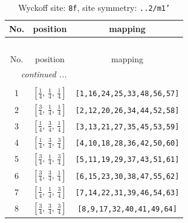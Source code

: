 \documentclass[fleqn,8pt]{jsarticle}
\begin{document}
\begin{longtable}{ccc}
\caption{Wyckoff site: {\tt 8f}, site symmetry: {\tt ..2/m1'}}
 \\
 \hline \hline
No. & position & mapping \\ \hline \endfirsthead

\multicolumn{2}{l}{\tablename\ \thetable{}} \\
 \hline \hline
No. & position & mapping \\ \hline \endhead

 \hline \hline
\multicolumn{2}{r}{\footnotesize\it continued ...} \\ \endfoot

 \hline \hline
\multicolumn{2}{r}{} \\ \endlastfoot

1 & $\left[ \frac{1}{4},\, \frac{1}{4},\, \frac{1}{4} \right]$ & {\tt [1,16,24,25,33,48,56,57]} \\ \hline
2 & $\left[ \frac{3}{4},\, \frac{1}{4},\, \frac{1}{4} \right]$ & {\tt [2,12,20,26,34,44,52,58]} \\ \hline
3 & $\left[ \frac{1}{4},\, \frac{3}{4},\, \frac{1}{4} \right]$ & {\tt [3,13,21,27,35,45,53,59]} \\ \hline
4 & $\left[ \frac{1}{4},\, \frac{3}{4},\, \frac{3}{4} \right]$ & {\tt [4,10,18,28,36,42,50,60]} \\ \hline
5 & $\left[ \frac{3}{4},\, \frac{1}{4},\, \frac{3}{4} \right]$ & {\tt [5,11,19,29,37,43,51,61]} \\ \hline
6 & $\left[ \frac{3}{4},\, \frac{3}{4},\, \frac{1}{4} \right]$ & {\tt [6,15,23,30,38,47,55,62]} \\ \hline
7 & $\left[ \frac{1}{4},\, \frac{1}{4},\, \frac{3}{4} \right]$ & {\tt [7,14,22,31,39,46,54,63]} \\ \hline
8 & $\left[ \frac{3}{4},\, \frac{3}{4},\, \frac{3}{4} \right]$ & {\tt [8,9,17,32,40,41,49,64]} \\
\end{longtable}
\renewcommand{\arraystretch}{1.2}
\end{document}
